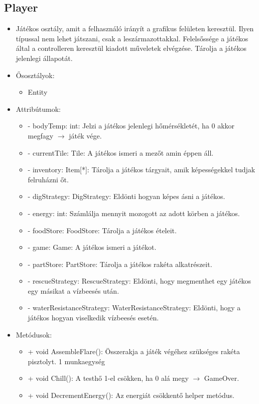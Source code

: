\subsection{Player}
\begin{itemize}
	\item Játékos osztály, amit a felhasználó irányít a grafikus felületen keresztül. Ilyen típussal nem lehet játszani, csak a leszármazottakkal. Felelsőssége a játékos által a controlleren keresztül kiadott műveletek elvégzése. Tárolja a játékos jelenlegi állapotát.
	\item Ősosztályok:
	\begin{itemize}
		\item Entity
	\end{itemize}
	\item Attribútumok:
	\begin{itemize}
		\item - bodyTemp: int: Jelzi a játékos jelenlegi hőmérsékletét, ha 0 akkor megfagy $\rightarrow$ játék vége.
		\item - currentTile: Tile: A játékos ismeri a mezőt amin éppen áll.
		\item - inventory: Item[*]: Tárolja a játékos tárgyait, amik képességekkel tudjak felruházni őt.
		\item - digStrategy: DigStrategy: Eldönti hogyan képes ásni a játékos.
		\item - energy: int: Számlálja mennyit mozogott az adott körben a játékos.
		\item - foodStore: FoodStore: Tárolja a játékos ételeit.
		\item - game: Game: A játékos ismeri a játékot.
		\item - partStore: PartStore: Tárolja a játékos rakéta alkatrészeit.
		\item - rescueStrategy: RescueStrategy: Eldönti, hogy megmenthet egy játékos egy másikat a vízbeesés után.
		\item - waterResistanceStrategy: WaterResistanceStrategy: Eldönti, hogy a játékos hogyan viselkedik vízbeesés esetén.
	\end{itemize}
	\item Metódusok:
	\begin{itemize}
		\item + void AssembleFlare(): Összerakja a játék végéhez szükséges rakéta pisztolyt. 1 munkaegység
		\item + void Chill(): A testhő 1-el csökken, ha 0 alá megy $\rightarrow$ GameOver.
		\item + void DecrementEnergy(): Az energiát csökkentő helper metódus.

\end{itemize}
\end{itemize}
